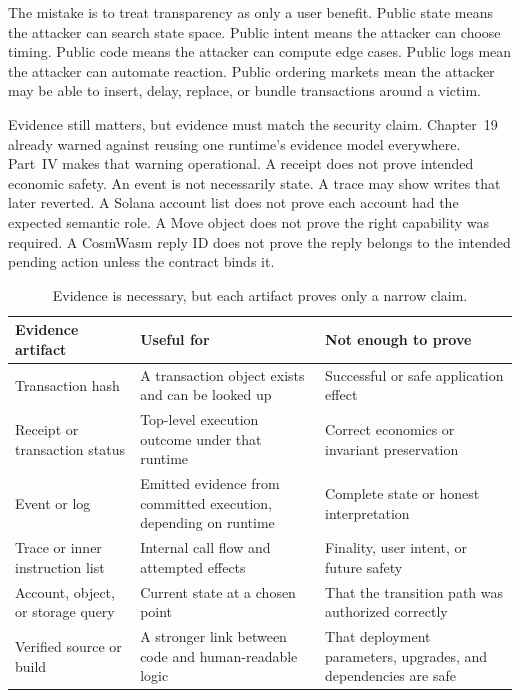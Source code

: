 The mistake is to treat transparency as only a user benefit. Public state means the attacker can search state space. Public intent means the attacker can choose timing. Public code means the attacker can compute edge cases. Public logs mean the attacker can automate reaction. Public ordering markets mean the attacker may be able to insert, delay, replace, or bundle transactions around a victim.

Evidence still matters, but evidence must match the security claim. Chapter~19 already warned against reusing one runtime's evidence model everywhere. Part~IV makes that warning operational. A receipt does not prove intended economic safety. An event is not necessarily state. A trace may show writes that later reverted. A Solana account list does not prove each account had the expected semantic role. A Move object does not prove the right capability was required. A CosmWasm reply ID does not prove the reply belongs to the intended pending action unless the contract binds it.

\begin{table}[htbp]
\centering
\small
\renewcommand{\arraystretch}{1.18}
\begin{tabularx}{\textwidth}{@{}>{\RaggedRight\arraybackslash}p{}>{\RaggedRight\arraybackslash}p{}X@{}}
\toprule
Evidence artifact & Useful for & Not enough to prove \\
\midrule
Transaction hash & A transaction object exists and can be looked up & Successful or safe application effect \\
Receipt or transaction status & Top-level execution outcome under that runtime & Correct economics or invariant preservation \\
Event or log & Emitted evidence from committed execution, depending on runtime & Complete state or honest interpretation \\
Trace or inner instruction list & Internal call flow and attempted effects & Finality, user intent, or future safety \\
Account, object, or storage query & Current state at a chosen point & That the transition path was authorized correctly \\
Verified source or build & A stronger link between code and human-readable logic & That deployment parameters, upgrades, and dependencies are safe \\
\bottomrule
\end{tabularx}
\caption{Evidence is necessary, but each artifact proves only a narrow claim.}
\end{table}

